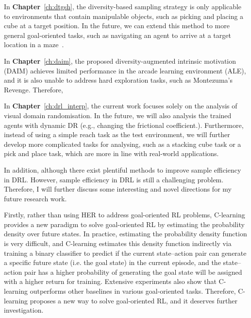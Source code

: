 In \textbf{Chapter}~\ref{ch:dtgsh}, the diversity-based sampling strategy is only applicable to environments that contain manipulable objects, such as picking and placing a cube at a target position. In the future, we can extend this method to more general goal-oriented tasks, such as navigating an agent to arrive at a target location in a maze~\cite{florensa2018automatic}.

In \textbf{Chapter}~\ref{ch:daim}, the proposed diversity-augmented intrinsic motivation (DAIM) achieves limited performance in the arcade learning environment (ALE), and it is also unable to address hard exploration tasks, such as Montezuma's Revenge. Therefore, 

In \textbf{Chapter}~\ref{ch:drl_interp}, the current work focuses solely on the analysis of visual domain randomisation. In the future, we will also analysis the trained agents with dynamic DR (e.g., changing the frictional coefficient.). Furthermore, instead of using a simple reach task as the test environment, we will further develop more complicated tasks for analysing, such as a stacking cube task or a pick and place task, which are more in line with real-world applications.

In addition, although there exist plentiful methods to improve sample efficiency in DRL. However, sample efficiency in DRL is still a challenging problem. Therefore, I will further discuss some interesting and novel directions for my future research work.

Firstly, rather than using HER to address goal-oriented RL problems, C-learning~\cite{eysenbach2020c} provides a new paradigm to solve goal-oriented RL by estimating the probability density over future states. In practice, estimating the probability density function is very difficult, and C-learning estimates this density function indirectly via training a binary classifier to predict if the current state--action pair can generate a specific future state (i.e. the goal state) in the current episode, and the state--action pair has a higher probability of generating the goal state will be assigned with a higher return for training. Extensive experiments also show that C-learning outperforms other baselines in various goal-oriented tasks. Therefore, C-learning proposes a new way to solve goal-oriented RL, and it deserves further investigation.

